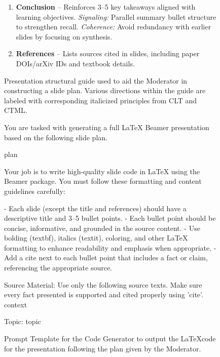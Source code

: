\documentclass[letterpaper]{article} %
\begin{document}
\begin{figure}
\begin{tcolorbox}[colback=gray!10,colframe=black!70,title=Annotated Structural Guide.]
\begin{enumerate}
    \item \textbf{Conclusion} – Reinforces 3–5 key takeaways aligned with learning objectives. 
    \textit{Signaling:} Parallel summary bullet structure to strengthen recall. 
    \textit{Coherence:} Avoid redundancy with earlier slides by focusing on synthesis.

    \item \textbf{References} – Lists sources cited in slides, including paper DOIs/arXiv IDs and textbook details. 
\end{enumerate}

\end{tcolorbox}
\caption{Presentation structural guide used to aid the Moderator in constructing a slide plan. Various directions within the guide are labeled with corresponding italicized principles from CLT and CTML. }
\label{fig:structural_guide}
\end{figure}


\begin{figure}
\begin{tcolorbox}[colback=gray!10, colframe=black!90, title=Code Generator: Slide Creation Prompt Template]

You are tasked with generating a full LaTeX Beamer presentation based on the following slide plan. 

{plan}

Your job is to write high-quality slide code in LaTeX using the Beamer package. You must follow these formatting and content guidelines carefully:

- Each slide (except the title and references) should have a descriptive title and 3–5 bullet points.
- Each bullet point should be concise, informative, and grounded in the source content.
- Use bolding (textbf{{}}), italics (textit{{}}), coloring, and other LaTeX formatting to enhance readability and emphasis when appropriate.
- Add a cite{{}} next to each bullet point that includes a fact or claim, referencing the appropriate source.  

Source Material: 
Use only the following source texts. Make sure every fact presented is supported and cited properly using 'cite{{}}'. 
{context}

Topic: {topic} 


\end{tcolorbox}
\caption{Prompt Template for the Code Generator to output the \LaTeX code for the presentation following the plan given by the Moderator.}
\label{fig:cg_code_prompt}
\end{figure}
\end{document}
